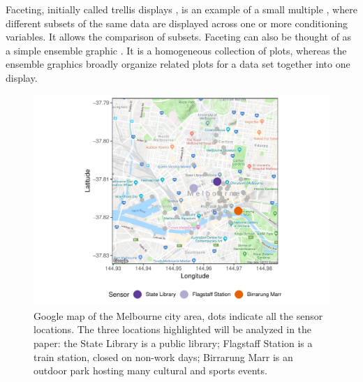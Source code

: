 \documentclass[12pt]{article}
\begin{document}
Faceting, initially called trellis displays \citep{becker_visual_1996}, is an example of a small multiple \citep{tufte1983visual}, where different subsets of the same data are displayed across one or more conditioning variables. It allows the comparison of subsets. Faceting can also be thought of as a simple ensemble graphic \citep{unwin_ensemble_2018}. It is a homogeneous collection of plots, whereas the ensemble graphics broadly organize related plots for a data set together into one display.

\begin{figure}

{\centering \includegraphics[width=0.7\linewidth]{figure/ped-map-1} 

}

\caption{Google map of the Melbourne city area, dots indicate all the sensor locations. The three locations highlighted will be analyzed in the paper: the State Library is a public library; Flagstaff Station is a train station, closed on non-work days; Birrarung Marr is an outdoor park hosting many cultural and sports events.}\label{fig:ped-map}
\end{figure}
\end{document}
